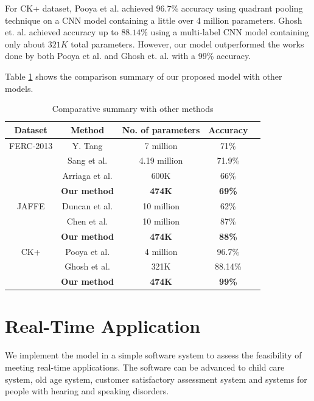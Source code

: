 \documentclass[master]{thesis-uestc}
\begin{document}
For CK+ dataset, Pooya et al.\cite{do_deep_7406361} achieved $96.7\%$ accuracy using quadrant pooling technique on a CNN model containing a little over 4 million parameters. Ghosh et. al. \cite{Ghosh_7344632} achieved accuracy up to $88.14\%$ using a multi-label CNN model containing only about $321K$ total parameters. However, our model outperformed the works done by both Pooya et al.\cite{do_deep_7406361} and Ghosh et. al. \cite{Ghosh_7344632} with a 99\% accuracy.

Table \ref{table_comparison} shows the comparison summary of our proposed model with other models. 

\begin{table}[ht]
\renewcommand{\arraystretch}{1.3}
\caption{Comparative summary with other methods}
\label{table_comparison}
\begin{center}
\begin{tabular}{|c|c|c|c|c|}
\hline
Dataset & Method & No. of parameters & Accuracy \\ \hline
FERC-2013 & Y. Tang\cite{tang2018} & 7 million & 71\% \\
                 & Sang et al.\cite{sang-2017} & 4.19 million & 71.9\% \\
	      & Arriaga et al.\cite{DBLP:journals/corr/abs-1710-07557} & 600K & 66\% \\
	      & \textbf{Our method} & \textbf{474K} & \textbf{69\%} \\
\hline
JAFFE & Duncan et al.\cite{duncan2016} & 10 million & 62\% \\
                 & Chen et al.\cite{7988558} & 10 million & 87\% \\
	      & \textbf{Our method} & \textbf{474K} & \textbf{88\%} \\
\hline
CK+ & Pooya et al.\cite{do_deep_7406361} & 4 million & 96.7\% \\
                 & Ghosh et al.\cite{Ghosh_7344632} & 321K & 88.14\% \\
	      & \textbf{Our method} & \textbf{474K} & \textbf{99\%} \\
\hline
\end{tabular}
\end{center}
\end{table}

\section{Real-Time Application}
We implement the model in a simple software system to assess the feasibility of meeting real-time applications. The software can be advanced to child care system, old age system, customer satisfactory assessment system and systems for people with hearing and speaking disorders.
\end{document}
